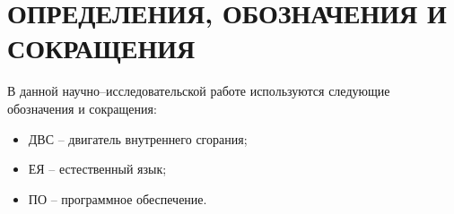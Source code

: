 \section*{ОПРЕДЕЛЕНИЯ, ОБОЗНАЧЕНИЯ И СОКРАЩЕНИЯ}
В данной научно--исследовательской работе используются следующие \, обозначения и сокращения:
\begin{itemize}
	\item ДВС -- двигатель внутреннего сгорания; 
	\item ЕЯ -- естественный язык;
	\item ПО -- программное обеспечение.
\end{itemize}

\pagebreak